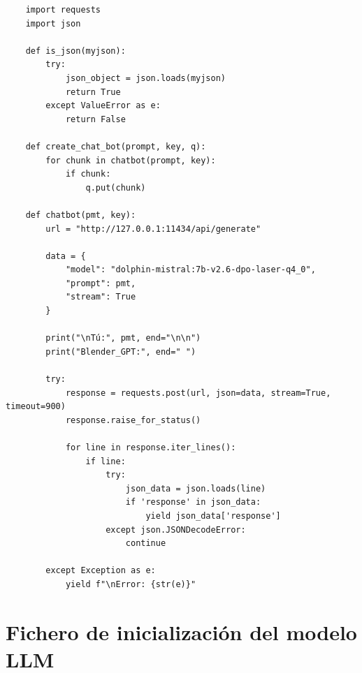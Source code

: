  
\captionsetup{type=listing}
\label{lst:streamBotAddon}
\begin{verbatim}
    import requests
    import json
    
    def is_json(myjson):
        try:
            json_object = json.loads(myjson)
            return True
        except ValueError as e:
            return False
    
    def create_chat_bot(prompt, key, q): 
        for chunk in chatbot(prompt, key):
            if chunk:
                q.put(chunk)
    
    def chatbot(pmt, key):
        url = "http://127.0.0.1:11434/api/generate"
        
        data = {
            "model": "dolphin-mistral:7b-v2.6-dpo-laser-q4_0",
            "prompt": pmt,
            "stream": True
        }
    
        print("\nTú:", pmt, end="\n\n")
        print("Blender_GPT:", end=" ")
    
        try:
            response = requests.post(url, json=data, stream=True, timeout=900)
            response.raise_for_status()
            
            for line in response.iter_lines():
                if line:
                    try:
                        json_data = json.loads(line)
                        if 'response' in json_data:
                            yield json_data['response']
                    except json.JSONDecodeError:
                        continue
                        
        except Exception as e:
            yield f"\nError: {str(e)}"
\end{verbatim}



\section{Fichero de inicialización del modelo LLM}
\label{sec:puntoA2}
 
